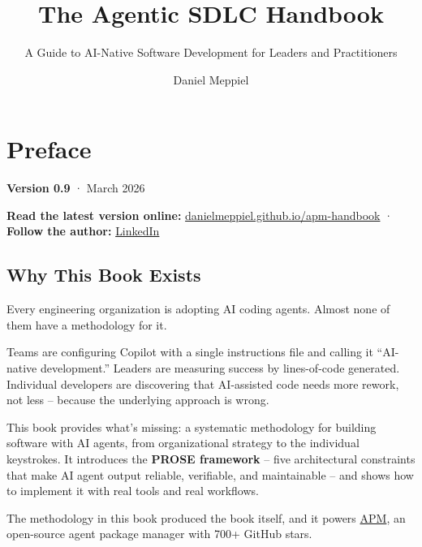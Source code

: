 \documentclass[
  a4paper,
  DIV=11,
  numbers=noendperiod]{scrreprt}
\title{The Agentic SDLC Handbook}
\subtitle{A Guide to AI-Native Software Development for Leaders and
Practitioners}
\author{Daniel Meppiel}
\date{}
\newcounter{none} %
\renewcommand*\contentsname{Table of contents}
\newcommand\contentsname{Table of contents}
\begin{document}
\maketitle

\renewcommand*\contentsname{Table of contents}
{
\setcounter{tocdepth}{2}
\tableofcontents
}


\chapter{Preface}\label{preface}

\textbf{Version 0.9} · March 2026

\begin{tcolorbox}[enhanced jigsaw, arc=.35mm, bottomrule=.15mm, breakable, colback=white, colframe=quarto-callout-note-color-frame, left=2mm, leftrule=.75mm, opacityback=0, rightrule=.15mm, toprule=.15mm]

\textbf{Read the latest version online:}
\href{https://danielmeppiel.github.io/apm-handbook/}{danielmeppiel.github.io/apm-handbook}
· \textbf{Follow the author:}
\href{https://www.linkedin.com/in/danielmeppiel/}{LinkedIn}

\end{tcolorbox}

\section{Why This Book Exists}\label{why-this-book-exists}

Every engineering organization is adopting AI coding agents. Almost none
of them have a methodology for it.

Teams are configuring Copilot with a single instructions file and
calling it ``AI-native development.'' Leaders are measuring success by
lines-of-code generated. Individual developers are discovering that
AI-assisted code needs more rework, not less -- because the underlying
approach is wrong.

This book provides what's missing: a systematic methodology for building
software with AI agents, from organizational strategy to the individual
keystrokes. It introduces the \textbf{PROSE framework} -- five
architectural constraints that make AI agent output reliable,
verifiable, and maintainable -- and shows how to implement it with real
tools and real workflows.

The methodology in this book produced the book itself, and it powers
\href{https://github.com/microsoft/apm}{APM}, an open-source agent
package manager with 700+ GitHub stars.
\end{document}
